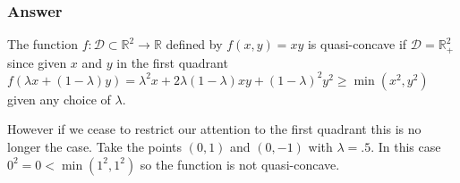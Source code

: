\documentclass[12pt]{article}
\begin{document}
\subsubsection{Answer}
The function $f:\mathcal{D} \subset \mathbb{R}^2 \to \mathbb{R}$ defined by $f(x,y)= x y $ is quasi-concave if $\mathcal{D} = \mathbb{R}_+^2$ since given $x$ and $y$ in the first quadrant $f(\lambda x + (1-\lambda)y) = \lambda^2 x + 2 \lambda (1 - \lambda) x y + (1-\lambda)^2y^2 \geq \min(x^2,y^2) $ given any choice of $\lambda$. 

However if we cease to restrict our attention to the first quadrant this is no longer the case. Take the points $(0,1)$ and $(0,-1)$ with $\lambda = .5$. In this case $0^2 = 0 < \min(1^2,1^2)$ so the function is not quasi-concave. 
\end{document}
